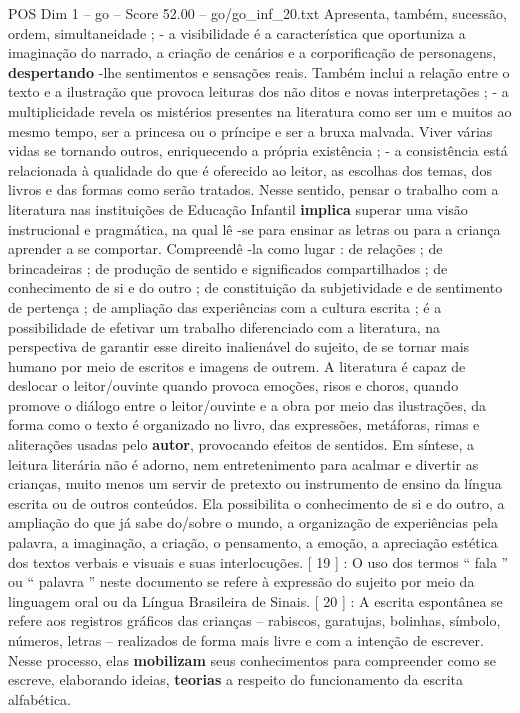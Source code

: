 \begin{textsample}{POS Dim 1 – go – Score 52.00 – go/go\_inf\_20.txt}
Apresenta, também, sucessão, ordem, simultaneidade ; - a visibilidade é a característica que oportuniza a imaginação do narrado, a criação de cenários e a corporificação de personagens, \textbf{despertando} -lhe sentimentos e sensações reais.
Também inclui a relação entre o texto e a ilustração que provoca leituras dos não ditos e novas interpretações ; - a multiplicidade revela os mistérios presentes na literatura como ser um e muitos ao mesmo tempo, ser a princesa ou o príncipe e ser a bruxa malvada.
Viver várias vidas se tornando outros, enriquecendo a própria existência ; - a consistência está relacionada à qualidade do que é oferecido ao leitor, as escolhas dos temas, dos livros e das formas como serão tratados.
Nesse sentido, pensar o trabalho com a literatura nas instituições de Educação Infantil \textbf{implica} superar uma visão instrucional e pragmática, na qual lê -se para ensinar as letras ou para a criança aprender a se comportar.
Compreendê -la como lugar : de relações ; de brincadeiras ; de produção de sentido e significados compartilhados ; de conhecimento de si e do outro ; de constituição da subjetividade e de sentimento de pertença ; de ampliação das experiências com a cultura escrita ; é a possibilidade de efetivar um trabalho diferenciado com a literatura, na perspectiva de garantir esse direito inalienável do sujeito, de se tornar mais humano por meio de escritos e imagens de outrem.
A literatura é capaz de deslocar o leitor/ouvinte quando provoca emoções, risos e choros, quando promove o diálogo entre o leitor/ouvinte e a obra por meio das ilustrações, da forma como o texto é organizado no livro, das expressões, metáforas, rimas e aliterações usadas pelo \textbf{autor}, provocando efeitos de sentidos.
Em síntese, a leitura literária não é adorno, nem entretenimento para acalmar e divertir as crianças, muito menos um servir de pretexto ou instrumento de ensino da língua escrita ou de outros conteúdos.
Ela possibilita o conhecimento de si e do outro, a ampliação do que já sabe do/sobre o mundo, a organização de experiências pela palavra, a imaginação, a criação, o pensamento, a emoção, a apreciação estética dos textos verbais e visuais e suas interlocuções. [ 19 ] : O uso dos termos “ fala ” ou “ palavra ” neste documento se refere à expressão do sujeito por meio da linguagem oral ou da Língua Brasileira de Sinais. [ 20 ] : A escrita espontânea se refere aos registros gráficos das crianças – rabiscos, garatujas, bolinhas, símbolo, números, letras – realizados de forma mais livre e com a intenção de escrever.
Nesse processo, elas \textbf{mobilizam} seus conhecimentos para compreender como se escreve, elaborando ideias, \textbf{teorias} a respeito do funcionamento da escrita alfabética.


\end{textsample}
